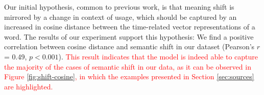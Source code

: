 

Our initial hypothesis, common to previous work, is that meaning shift
is mirrored by a change in context of usage, which should be captured
by an increased in cosine distance between the time-related vector
representations of a word. The results of our experiment
support this hypothesis: We find a positive correlation between cosine
distance and semantic shift in our dataset (Pearson's $r$= 0.49,
$p<0.001$). \textcolor{red}{ This result indicates that the model is indeed able to capture the majority of the cases of semantic shift in our data, as it can be observed in Figure \ref{fig:shift-cosine}, in which the examples presented in Section \ref{sec:sources} are highlighted.}  

